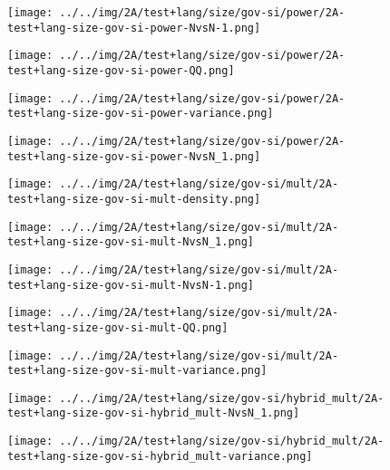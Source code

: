 \begin{figure}[H]
\centering	\texttt{[image: ../../img/2A/test+lang/size/gov-si/power/2A-test+lang-size-gov-si-power-NvsN-1.png]}
\end{figure}
\begin{figure}[H]
\centering	\texttt{[image: ../../img/2A/test+lang/size/gov-si/power/2A-test+lang-size-gov-si-power-QQ.png]}
\end{figure}
\begin{figure}[H]
\centering	\texttt{[image: ../../img/2A/test+lang/size/gov-si/power/2A-test+lang-size-gov-si-power-variance.png]}
\end{figure}
\begin{figure}[H]
\centering	\texttt{[image: ../../img/2A/test+lang/size/gov-si/power/2A-test+lang-size-gov-si-power-NvsN\_1.png]}
\end{figure}
\begin{figure}[H]
\centering	\texttt{[image: ../../img/2A/test+lang/size/gov-si/mult/2A-test+lang-size-gov-si-mult-density.png]}
\end{figure}
\begin{figure}[H]
\centering	\texttt{[image: ../../img/2A/test+lang/size/gov-si/mult/2A-test+lang-size-gov-si-mult-NvsN\_1.png]}
\end{figure}
\begin{figure}[H]
\centering	\texttt{[image: ../../img/2A/test+lang/size/gov-si/mult/2A-test+lang-size-gov-si-mult-NvsN-1.png]}
\end{figure}
\begin{figure}[H]
\centering	\texttt{[image: ../../img/2A/test+lang/size/gov-si/mult/2A-test+lang-size-gov-si-mult-QQ.png]}
\end{figure}
\begin{figure}[H]
\centering	\texttt{[image: ../../img/2A/test+lang/size/gov-si/mult/2A-test+lang-size-gov-si-mult-variance.png]}
\end{figure}
\begin{figure}[H]
\centering	\texttt{[image: ../../img/2A/test+lang/size/gov-si/hybrid\_mult/2A-test+lang-size-gov-si-hybrid\_mult-NvsN\_1.png]}
\end{figure}
\begin{figure}[H]
\centering	\texttt{[image: ../../img/2A/test+lang/size/gov-si/hybrid\_mult/2A-test+lang-size-gov-si-hybrid\_mult-variance.png]}
\end{figure}
